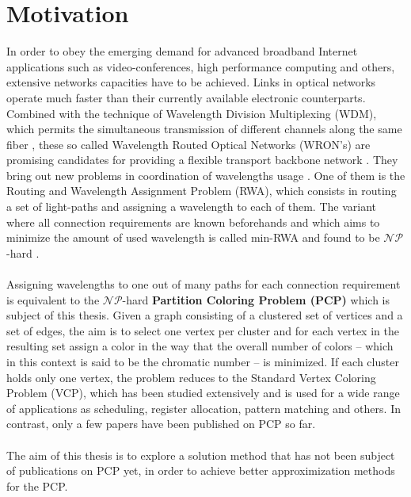\section{Motivation}

In order to obey the emerging demand for advanced broadband Internet applications such as video-conferences, high performance computing and others, extensive networks capacities have to be achieved. Links in optical networks operate much faster than their currently available electronic counterparts. Combined with the technique of Wavelength Division Multiplexing (WDM), which permits the simultaneous transmission of different channels along the same fiber \cite{noronha-06}, these so called Wavelength Routed Optical Networks (WRON's) are promising candidates for providing a flexible transport backbone network \cite{krishnaswamy-01}. They bring out new problems in coordination of wavelengths usage \cite{murthy-02}. One of them is the Routing and Wavelength Assignment Problem (RWA), which consists in routing a set of light-paths and assigning a wavelength to each of them. The variant where all connection requirements are known beforehands and which aims to minimize the amount of used wavelength is called min-RWA and found to be $\mathcal{NP}$-hard \cite{erlebach-01}.\\\\
Assigning wavelengths to one out of many paths for each connection requirement is equivalent to the $\mathcal{NP}$-hard \textbf{Partition Coloring Problem (PCP)} \cite{li-00} which is subject of this thesis. Given a graph consisting of a clustered set of vertices and a set of edges, the aim is to select one vertex per cluster and for each vertex in the resulting set assign a color in the way that the overall number of colors -- which in this context is said to be the chromatic number -- is minimized. If each cluster holds only one vertex, the problem reduces to the Standard Vertex Coloring Problem (VCP), which has been studied extensively and is used for a wide range of applications as scheduling, register allocation, pattern matching and others. In contrast, only a few papers have been published on PCP so far.\\\\
The aim of this thesis is to explore a solution method that has not been subject of publications on PCP yet,	in order to achieve better approximization methods for the PCP.


